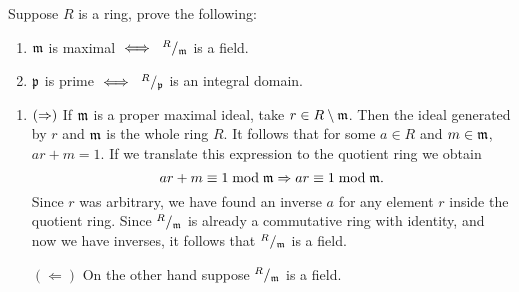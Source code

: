 \documentclass[12pt]{memoir}
\begin{document}
\begin{Ej}[2.1.2]
  Suppose $R$ is a ring, prove the following:
  \vspace{-0.4em}
  \begin{enumerate}
    \itemsep=-0.4em
    \item $\mathfrak{m}$ is maximal $\iff\ \quot{R}{\lie m}$ is a field. 
    \item $\mathfrak{p}$ is prime $\iff\ \quot{R}{\lie p}$ is an integral domain. 
  \end{enumerate}
\end{Ej}

\begin{ptcbr}
  \begin{enumerate}
    \itemsep=-0.4em
    \item $(\Rightarrow)$ If $\mathfrak{m}$ is a proper maximal ideal, take $r\in R\setminus\mathfrak{m}$. Then the ideal generated by $r$ and $\mathfrak{m}$ is the whole ring $R$. It follows that for some $a\in R$ and $m\in\mathfrak{m}$, $ar+m=1$. If we translate this expression to the quotient ring we obtain
    $$ar+m\equiv 1\bmod \mathfrak{m}\Rightarrow ar\equiv 1\bmod\mathfrak{m}.$$ %
    Since $r$ was arbitrary, we have found an inverse $a$ for any element $r$ inside the quotient ring. Since $\quot{R}{\lie m}$ is already a commutative ring with identity, and now we have inverses, it follows that $\quot{R}{\lie m}$ is a field.\par 
    $(\Leftarrow)$ On the other hand suppose $\quot{R}{\lie m}$ is a field.
  \end{enumerate}
\end{ptcbr}
\end{document}
